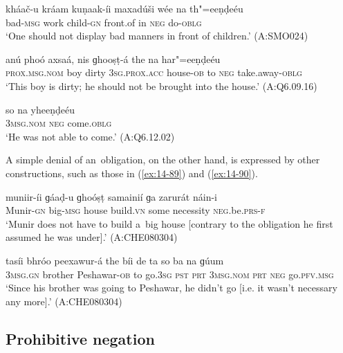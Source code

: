 \begin{exe}
\ex
\label{ex:14-86}
\gll kháač-u kráam kuṇaak-íi maxadúši wée na  th"=eeṇḍeéu \\
bad-\textsc{msg} work child-\textsc{gn} front.of in \textsc{neg} do-\textsc{oblg } \\
\glt `One should not display bad manners in front of children.' (A:SMO024)

\ex
\label{ex:14-87}
\gll anú phoó axsaá, nis ɡhooṣṭ-á  the na har"=eeṇḍeéu \\
\textsc{prox.msg.nom} boy dirty \textsc{3sg.prox.acc} house-\textsc{ob}  to \textsc{neg} take.away-\textsc{oblg }\\
\glt `This boy is dirty; he should not be brought into the house.' (A:Q6.09.16)

\ex
\label{ex:14-88}
\gll so na yheeṇḍeéu \\
\textsc{3msg}.\textsc{nom} \textsc{neg} come.\textsc{oblg}  \\
\glt `He was not able to come.' (A:Q6.12.02)
\end{exe}

A simple denial of an~obligation, on the other hand, is expressed by other constructions, such as those in (\ref{ex:14-89}) and (\ref{ex:14-90}).

\begin{exe}
\ex
\label{ex:14-89}
\gll muniir-íi ɡáaḍ-u ɡhoóṣṭ samainií ɡa zarurát  náin-i \\
Munir-\textsc{gn} big-\textsc{msg} house build.\textsc{vn} some necessity  \textsc{neg.}be.\textsc{prs}-\textsc{f } \\
\glt `Munir does not have to build a~big house [contrary to the obligation he first assumed he was under].' (A:CHE080304)

\ex
\label{ex:14-90}
\gll tasíi bhróo peexawur-á the bíi de ta  so ba na ɡúum \\
\textsc{3msg}.\textsc{gn} brother Peshawar-\textsc{ob} to go.\textsc{3sg} \textsc{pst} \textsc{prt}  \textsc{3msg.nom} \textsc{prt} \textsc{neg} go.\textsc{pfv.msg } \\
\glt `Since his brother was going to Peshawar, he didn't go [i.e. it wasn't necessary any more].' (A:CHE080304)
\end{exe}

\subsection{Prohibitive negation}
\label{subsec:14-3-5}


